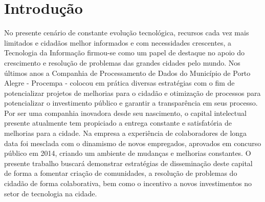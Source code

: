 \chapter{Introdução}

No presente cenário de constante evolução tecnológica, recursos cada vez mais limitados e cidadãos melhor informados e com necessidades crescentes, a Tecnologia da Informação firmou-se como um papel de destaque no apoio do crescimento e resolução de problemas das grandes cidades pelo mundo.
Nos últimos anos a Companhia de Processamento de Dados do Município de Porto Alegre - Procempa - colocou em prática diversas estratégias com o fim de potencializar projetos de melhorias para o cidadão e otimização de processos para potencializar o investimento público e garantir a transparência em seus processo.
Por ser uma companhia inovadora desde seu nascimento, o capital intelectual presente atualmente tem propiciado a entrega constante e satisfatória de melhorias para a cidade. Na empresa a experiência de colaboradores de longa data foi mesclada com o dinamismo de novos empregados, aprovados em concurso público em 2014, criando um ambiente de mudanças e melhorias constantes.
O presente trabalho buscará demonstrar estratégias de disseminação deste capital de forma a fomentar criação de comunidades, a resolução de problemas do cidadão de forma colaborativa, bem como o incentivo a novos investimentos no setor de tecnologia na cidade.
